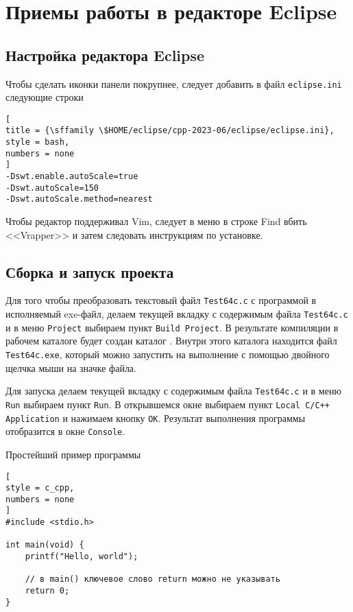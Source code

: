 \documentclass[%
	11pt,
	a4paper,
	utf8,
		]{article}
\begin{document}
\section{Приемы работы в редакторе Eclipse}

\subsection{Настройка редактора Eclipse}

Чтобы сделать иконки панели покрупнее, следует добавить в файл \verb|eclipse.ini| следующие строки
\begin{lstlisting}[
title = {\sffamily \$HOME/eclipse/cpp-2023-06/eclipse/eclipse.ini},
style = bash,
numbers = none
]
-Dswt.enable.autoScale=true
-Dswt.autoScale=150
-Dswt.autoScale.method=nearest
\end{lstlisting}

Чтобы редактор поддерживал Vim, следует в меню  в строке Find вбить <<Vrapper>> и затем следовать инструкциям по установке.

\subsection{Сборка и запуск проекта}

Для того чтобы преобразовать текстовый файл \verb|Test64c.c| с программой в исполняемый exe-файл, делаем текущей вкладку с содержимым файла \verb|Test64c.c| и в меню \verb|Project| выбираем пункт \verb|Build Project|. В результате компиляции в рабочем каталоге будет создан каталог . Внутри этого каталога находится файл \verb|Test64c.exe|, который можно запустить на выполнение с помощью двойного щелчка мыши на значке файла.

Для запуска делаем текущей вкладку с содержимым файла \verb|Test64c.c| и в меню \verb|Run| выбираем пункт \verb|Run|. В открывшемся окне выбираем пункт \verb|Local C/C++ Application| и нажимаем кнопку \verb|OK|. Результат выполнения программы отобразится в окне \verb|Console|.

Простейший пример программы
\begin{lstlisting}[
style = c_cpp,
numbers = none
]
#include <stdio.h>

int main(void) {
    printf("Hello, world");
    
    // в main() ключевое слово return можно не указывать
    return 0;
}
\end{lstlisting}
\end{document}
